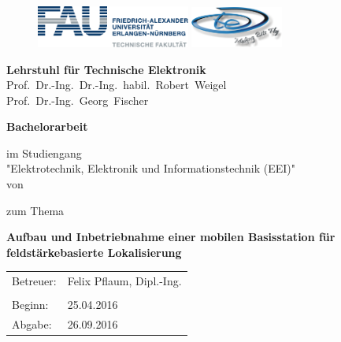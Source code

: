 \begin{titlepage}
\begin{figure}
\includegraphics[width=0.45\textwidth]{Abbildungen/Logo/FAUlogo}\hfill
\includegraphics[width=0.27\textwidth]{Abbildungen/Logo/LTElogo}
\end{figure}
\hspace{0.1cm}	
\center
\LARGE
	\textbf{Lehrstuhl für Technische Elektronik} \\
	Prof.~Dr.-Ing.~Dr.-Ing.~habil.~Robert~Weigel	\\
	Prof.~Dr.-Ing.~Georg~Fischer\\
\vspace{1cm}	

\LARGE
	\textbf{Bachelorarbeit}
\vspace{0.9cm}

\large
im Studiengang\\ "Elektrotechnik, Elektronik und Informationstechnik (EEI)"\\
\vspace{0.5cm}
von
\vspace{0.5cm}

\LARGE{
\authorname}
\vspace{0.7cm}

\large
zum Thema
\vspace{0.9cm}

\LARGE
\textbf{Aufbau und Inbetriebnahme einer mobilen Basisstation für 
feldstärkebasierte Lokalisierung}
\vspace{1.7cm}

\large
\begin{tabular}{ll}
Betreuer: & Felix Pflaum, Dipl.-Ing. \\
 &\\
Beginn: & 25.04.2016\\
Abgabe: & 26.09.2016\\
\end{tabular}
\end{titlepage}